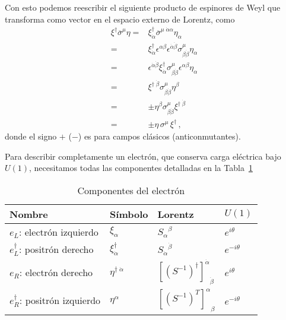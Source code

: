 Con esto podemos reescribir el siguiente producto de espinores  de Weyl que transforma como vector en el espacio externo de Lorentz, como
\begin{align}
\label{eq:exxe}
  \xi^{\dagger}\overline{\sigma}^{\mu}\eta=& \xi^{\dagger}_{\dot{\alpha}}\overline{\sigma}^{\mu\;\dot{\alpha}\alpha}\eta_{\alpha}\nonumber\\
=&\xi^{\dagger}_{\dot{\alpha}}\epsilon^{\alpha\beta}\epsilon^{\dot{\alpha}\dot{\beta}}{\sigma}^{\mu}_{\beta\dot{\beta}} \eta_{\alpha}\nonumber\\
  =&\epsilon^{\dot{\alpha}\dot{\beta}}\xi^{\dagger}_{\dot{\alpha}}{\sigma}^{\mu}_{\beta\dot{\beta}} \epsilon^{\alpha\beta}\eta_{\alpha}\nonumber\\
  =&\xi^{\dagger\;\dot{\beta}}{\sigma}^{\mu}_{\beta\dot{\beta}} \eta^{\beta}\nonumber\\
  =&\pm\eta^{\beta}{\sigma}^{\mu}_{\beta\dot{\beta}}\xi^{\dagger\;\dot{\beta}} \nonumber\\
  =&\pm\eta\,{\sigma}^{\mu}\,\xi^{\dagger} \,,
\end{align}
donde el signo $+$ ($-$) es para campos clásicos (anticonmutantes).

Para describir completamente un electrón, que conserva carga eléctrica bajo $U(1)$, necesitamos todas las componentes detalladas en la Tabla~\ref{tab:electron}
\begin{table}
  \centering
  \begin{tabular}{llll}
    Nombre & Símbolo & Lorentz & $U(1)$\\\hline
   $e_L$: electrón izquierdo & $\xi_{\alpha}$ & ${S_{\alpha}}^{\beta}$ & $e^{i\theta}$\\
   $e_L^{\dagger}$: positrón derecho   & $\xi^{\dagger}_{\dot{\alpha}}$ & ${S_{\dot{\alpha}}}^{\dot{\beta}}$ & $e^{-i\theta}$\\
   $e_R$: electrón derecho   & $\eta^{\dagger\;\dot{\alpha}}$ & ${\left[ \left( S^{-1} \right)^\dagger \right]^{\dot{\alpha}}}_{\dot{\beta}}$& $e^{i\theta}$\\
   $e_R^{\dagger}$: positrón izquierdo&$\eta^{\alpha}$& ${\left[ \left( S^{-1} \right)^T \right]^{\alpha}}_{\beta}$ & $e^{-i\theta}$\\\hline
  \end{tabular}
  \caption{Componentes del electrón}
  \label{tab:electron}
\end{table}


